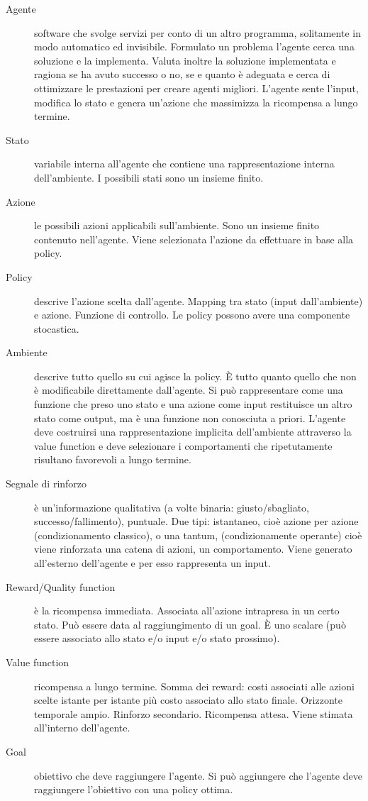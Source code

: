 \documentclass[\main/main.tex]{subfiles}
\begin{document}
\begin{description}
\item [Agente] software che svolge servizi per conto di un altro programma, solitamente in modo automatico ed invisibile. Formulato un problema l’agente cerca una soluzione e la implementa. Valuta inoltre la soluzione implementata e ragiona se ha avuto successo o no, se e quanto è adeguata e cerca di ottimizzare le prestazioni per creare agenti migliori. L'agente sente l'input, modifica lo stato e genera un'azione che massimizza la ricompensa a lungo termine.
\item [Stato] variabile interna all’agente che contiene una rappresentazione interna dell’ambiente. I possibili stati sono un insieme finito.
\item [Azione] le possibili azioni applicabili sull’ambiente. Sono un insieme finito contenuto nell’agente. Viene selezionata l’azione da effettuare in base alla policy.
\item [Policy] descrive l’azione scelta dall’agente. Mapping tra stato (input dall’ambiente) e azione. Funzione di controllo. Le policy possono avere una componente stocastica. 
\item [Ambiente] descrive tutto quello su cui agisce la policy. È tutto quanto quello che non è modificabile direttamente dall’agente. Si può rappresentare come una funzione che preso uno stato e una azione come input restituisce un altro stato come output, ma è una funzione non conosciuta a priori. L’agente deve costruirsi una rappresentazione implicita dell’ambiente attraverso la value function e deve selezionare i comportamenti che ripetutamente risultano favorevoli a lungo termine.
\item [Segnale di rinforzo] è un’informazione qualitativa (a volte binaria: giusto/sbagliato, successo/fallimento), puntuale. Due tipi: istantaneo, cioè azione per azione (condizionamento classico), o una tantum, (condizionamente operante) cioè viene rinforzata una catena di azioni, un comportamento. Viene generato all’esterno dell’agente e per esso rappresenta un input.
\item [Reward/Quality function] è la ricompensa immediata. Associata all’azione intrapresa in un certo stato. Può essere data al raggiungimento di un goal. È uno scalare (può essere associato allo stato e/o input e/o stato prossimo).
\item [Value function] ricompensa a lungo termine. Somma dei reward: costi associati alle azioni scelte istante per istante più costo associato allo stato finale. Orizzonte temporale ampio. Rinforzo secondario. Ricompensa attesa. Viene stimata all’interno dell’agente.
\item [Goal] obiettivo che deve raggiungere l’agente. Si può aggiungere che l’agente deve raggiungere l’obiettivo con una policy ottima.
\end{description}
\end{document}
